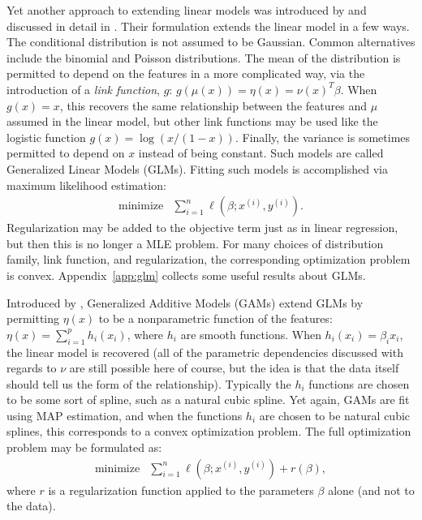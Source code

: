 \documentclass[12pt]{article}
\begin{document}
Yet another approach to extending linear models was introduced by \cite{NW:72} and discussed in detail in \cite{MN:1983}. Their formulation extends the linear model in a few ways. The conditional distribution is not assumed to be Gaussian. Common alternatives include the binomial and Poisson distributions. The mean of the distribution is permitted to depend on the features in a more complicated way, via the introduction of a \textit{link function}, $g$: $g(\mu(x)) = \eta(x) = \nu(x)^T \beta$. When $g(x) = x$, this recovers the same relationship between the features and $\mu$ assumed in the linear model, but other link functions may be used like the logistic function $g(x) = \log(x / (1-x))$. Finally, the variance is sometimes permitted to depend on $x$ instead of being constant. Such models are called Generalized Linear Models (GLMs). Fitting such models is accomplished via maximum likelihood estimation:
\begin{displaymath}
        \begin{array}{ll}
            \mbox{minimize} & {\displaystyle \sum_{i=1}^n} \ell\left( \beta; x^{(i)}, y^{(i)}\right).
        \end{array}
\end{displaymath}
Regularization may be added to the objective term just as in linear regression, but then this is no longer a MLE problem. For many choices of distribution family, link function, and regularization, the corresponding optimization problem is convex. Appendix~\ref{app:glm} collects some useful results about GLMs.

Introduced by \cite{HT:86}, Generalized Additive Models (GAMs) extend GLMs by permitting $\eta(x)$ to be a nonparametric function of the features: $\eta(x) = \sum_{i=1}^p h_i (x_i)$, where $h_i$ are smooth functions. When $h_i(x_i) = \beta_i x_i$, the linear model is recovered (all of the parametric dependencies discussed with regards to $\nu$  are still possible here of course, but the idea is that the data itself should tell us the form of the relationship). Typically the $h_i$ functions are chosen to be some sort of spline, such as a natural cubic spline. Yet again, GAMs are fit using MAP estimation, and when the functions $h_i$ are chosen to be natural cubic splines, this corresponds to a convex optimization problem. The full optimization problem may be formulated as:
\begin{displaymath}
        \begin{array}{ll}
            \mbox{minimize} & {\displaystyle \sum_{i=1}^n} \ell\left( \beta; x^{(i)}, y^{(i)}\right) + r(\beta),
        \end{array}
\end{displaymath}
where $r$ is a regularization function applied to the parameters $\beta$ alone (and not to the data).
\end{document}
